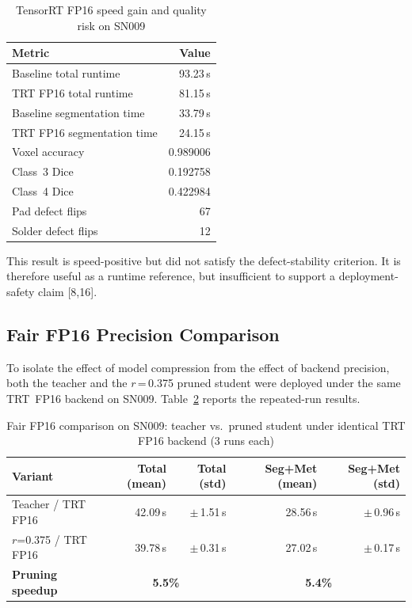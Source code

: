 \begin{table}[H]
\centering
\caption{TensorRT FP16 speed gain and quality risk on SN009}
\label{tab:trt-fp16-risk}
\renewcommand{\arraystretch}{1.15}
\begin{tabular}{l | r}
\toprule
\textbf{Metric} & \textbf{Value} \\
\midrule
Baseline total runtime      & 93.23\,s \\
TRT FP16 total runtime      & 81.15\,s \\
Baseline segmentation time  & 33.79\,s \\
TRT FP16 segmentation time  & 24.15\,s \\
\midrule
Voxel accuracy              & 0.989006 \\
Class~3 Dice                & 0.192758 \\
Class~4 Dice                & 0.422984 \\
Pad defect flips            & 67 \\
Solder defect flips         & 12 \\
\bottomrule
\end{tabular}
\end{table}

This result is speed-positive but did not satisfy the defect-stability criterion. It is therefore
useful as a runtime reference, but insufficient to support a deployment-safety claim {[}8,16{]}.

\hypertarget{fair-fp16-comparison}{%
\subsection{Fair FP16 Precision Comparison}\label{fair-fp16-comparison}}

To isolate the effect of model compression from the effect of backend precision, both the teacher and the $r$\,=\,0.375 pruned student were deployed under the same TRT~FP16 backend on SN009. Table~\ref{tab:fp16-fair} reports the repeated-run results.

\begin{table}[H]
\centering
\caption{Fair FP16 comparison on SN009: teacher vs.\ pruned student under identical TRT FP16 backend (3 runs each)}
\label{tab:fp16-fair}
\renewcommand{\arraystretch}{1.15}
\begin{tabular}{l | rr | rr}
\toprule
\textbf{Variant} & \textbf{Total (mean)} & \textbf{Total (std)} & \textbf{Seg+Met (mean)} & \textbf{Seg+Met (std)} \\
\midrule
Teacher / TRT FP16      & 42.09\,s & $\pm$\,1.51\,s & 28.56\,s & $\pm$\,0.96\,s \\
$r$=0.375 / TRT FP16    & 39.78\,s & $\pm$\,0.31\,s & 27.02\,s & $\pm$\,0.17\,s \\
\midrule
\textbf{Pruning speedup} & \multicolumn{2}{c|}{\textbf{5.5\%}} & \multicolumn{2}{c}{\textbf{5.4\%}} \\
\bottomrule
\end{tabular}
\end{table}

